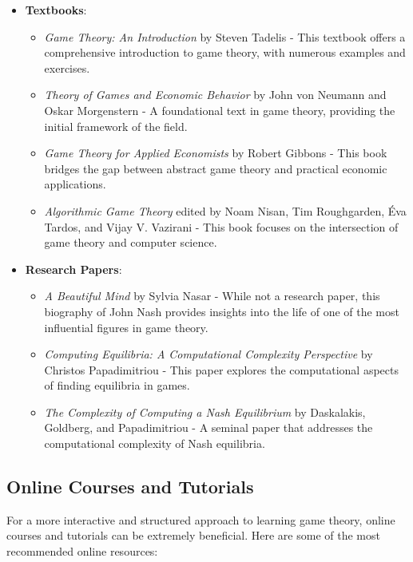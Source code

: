 \documentclass[12pt]{book} %
\begin{document}
\begin{itemize}
    \item \textbf{Textbooks}:
        \begin{itemize}
            \item \textit{Game Theory: An Introduction} by Steven Tadelis - This textbook offers a comprehensive introduction to game theory, with numerous examples and exercises.
            \item \textit{Theory of Games and Economic Behavior} by John von Neumann and Oskar Morgenstern - A foundational text in game theory, providing the initial framework of the field.
            \item \textit{Game Theory for Applied Economists} by Robert Gibbons - This book bridges the gap between abstract game theory and practical economic applications.
            \item \textit{Algorithmic Game Theory} edited by Noam Nisan, Tim Roughgarden, Éva Tardos, and Vijay V. Vazirani - This book focuses on the intersection of game theory and computer science.
        \end{itemize}
    \item \textbf{Research Papers}:
        \begin{itemize}
            \item \textit{A Beautiful Mind} by Sylvia Nasar - While not a research paper, this biography of John Nash provides insights into the life of one of the most influential figures in game theory.
            \item \textit{Computing Equilibria: A Computational Complexity Perspective} by Christos Papadimitriou - This paper explores the computational aspects of finding equilibria in games.
            \item \textit{The Complexity of Computing a Nash Equilibrium} by Daskalakis, Goldberg, and Papadimitriou - A seminal paper that addresses the computational complexity of Nash equilibria.
        \end{itemize}
\end{itemize}

\subsection{Online Courses and Tutorials}
For a more interactive and structured approach to learning game theory, online courses and tutorials can be extremely beneficial. Here are some of the most recommended online resources:
\end{document}
